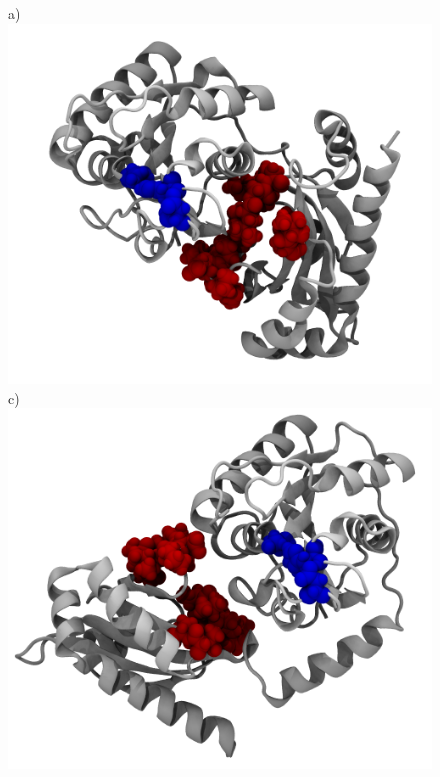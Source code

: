 \documentclass[english, a4paper, 12pt, titlepage, draft]{article}
\begin{document}
\begin{figure}
    \begin{minipage}[]{0.45\linewidth}
        \centering
        a)
        \includegraphics[width=\textwidth]{figures/Complex_structures/structure1.png}  
        c)
        \includegraphics[width=\textwidth]{figures/Complex_structures/structure3.png}  
    \end{minipage}
\hspace{0.5cm}
    \begin{minipage}[]{0.45\linewidth}

\end{minipage}
\end{figure}
\end{document}
